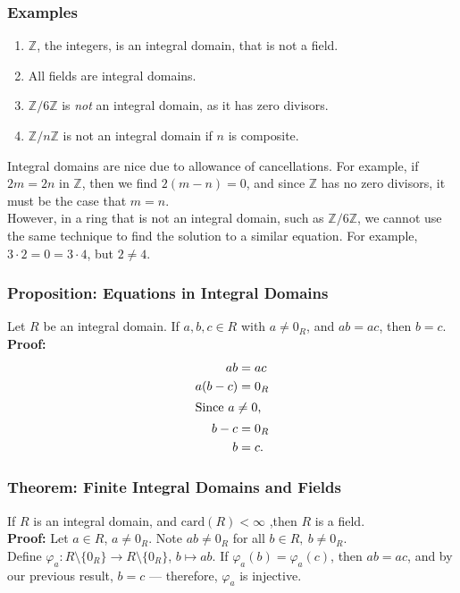 \documentclass[10pt]{extarticle}
\newcommand{\card}{\text{card}}
\newcommand{\Z}{\mathbb{Z}}
\begin{document}
  \subsubsection{Examples}%
  \begin{enumerate}[(1)]
    \item $\Z$, the integers, is an integral domain, that is not a field.
    \item All fields are integral domains.
    \item $\Z/6\Z$ is \textit{not} an integral domain, as it has zero divisors.
    \item $\Z/n\Z$ is not an integral domain if $n$ is composite.
  \end{enumerate}
  Integral domains are nice due to allowance of cancellations. For example, if $2m = 2n$ in $\Z$, then we find $2(m-n) = 0$, and since $\Z$ has no zero divisors, it must be the case that $m=n$.\\

  However, in a ring that is not an integral domain, such as $\Z/6\Z$, we cannot use the same technique to find the solution to a similar equation. For example, $3\cdot 2 = 0 = 3\cdot 4$, but $2\neq 4$.
  \subsubsection{Proposition: Equations in Integral Domains}%
  Let $R$ be an integral domain. If $a,b,c\in R$ with $a\neq 0_R$, and $ab = ac$, then $b=c$.\\

  \textbf{Proof:}
  \begin{align*}
    ab &= ac\\
    a(b-c) &= 0_R\\
    \shortintertext{Since $a\neq 0$,}
    b-c &= 0_R\\
    b &= c.
  \end{align*}
  \subsubsection{Theorem: Finite Integral Domains and Fields}%
  If $R$ is an integral domain, and $\card(R) < \infty$ ,then $R$ is a field.\\

  \textbf{Proof:} Let $a\in R$, $a\neq 0_{R}$. Note $ab \neq 0_R$ for all $b\in R,~b\neq 0_R$.\\

  Define $\varphi_a: R\setminus\{0_R\} \rightarrow R\setminus\{0_R\}$, $b\mapsto ab$. If $\varphi_a(b) = \varphi_a(c)$, then $ab = ac$, and by our previous result, $b=c$ --- therefore, $\varphi_a$ is injective.\\
\end{document}

